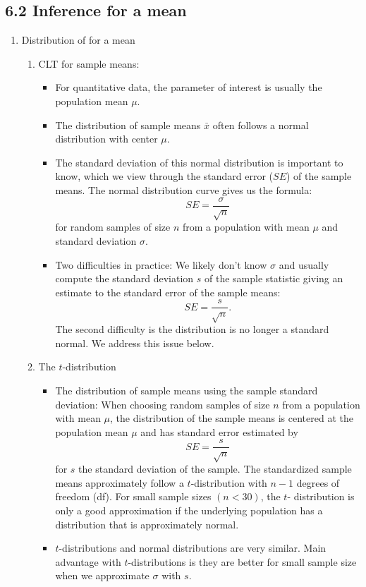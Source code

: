 \documentclass{article}
\begin{document}
\subsection{6.2 Inference for a mean}
\begin{enumerate}

\item Distribution of for a mean
\begin{enumerate}
\item CLT for sample means:
\begin{itemize}
\item For quantitative data, the parameter of interest is usually the population mean $\mu$.
\item The distribution of sample means $\bar{x}$ often follows a normal distribution with center $\mu$.
\item The standard deviation of this normal distribution is important to know, which we view through the standard error ($SE$) of the sample means. The normal distribution curve gives us the formula:
\[
SE = \frac{\sigma}{\sqrt{n}}
\]
for random samples of size $n$ from a population with mean $\mu$ and standard deviation $\sigma$.
\item Two difficulties in practice: We likely don't know $\sigma$ and usually compute the standard deviation $s$ of the sample statistic giving an estimate to the standard error of the sample means:
\[
SE = \frac{s}{\sqrt{n}}.
\]
The second difficulty is the distribution is no longer a standard normal. We address this issue below.
\end{itemize}

\item The $t$-distribution
\begin{itemize}
\item The distribution of sample means using the sample standard deviation: When choosing random samples of size $n$ from a population with mean $\mu$, the distribution of the sample means is centered at the population mean $\mu$ and has standard error estimated by 
\[
SE = \frac{s}{\sqrt{n}}
\]
for $s$ the standard deviation of the sample. The standardized sample means approximately follow a $t$-distribution with $n-1$ degrees of freedom (df). For small sample sizes $(n<30)$, the $t$- distribution is only a good approximation if the underlying population has a distribution that is approximately normal.
\item $t$-distributions and normal distributions are very similar. Main advantage with $t$-distributions is they are better for small sample size when we approximate $\sigma$ with $s$.
\end{itemize}


\end{enumerate}
\end{enumerate}
\end{document}
